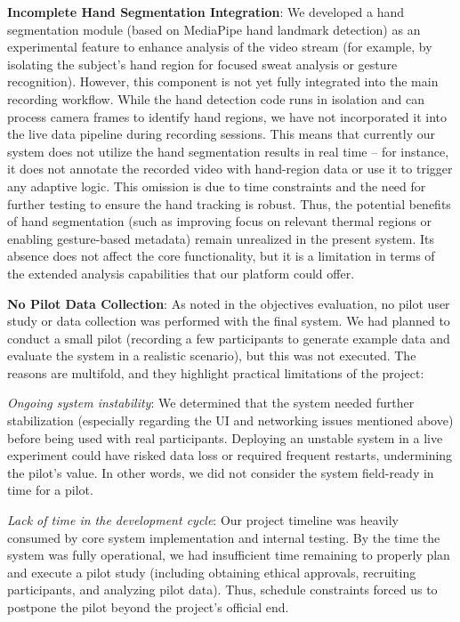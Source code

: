 \textbf{Incomplete Hand Segmentation Integration}: We developed a hand segmentation module (based on MediaPipe hand landmark detection) as an experimental feature to enhance analysis of the video stream (for example, by isolating the subject's hand region for focused sweat analysis or gesture recognition). However, this component is not yet fully integrated into the main recording workflow. While the hand detection code runs in isolation and can process camera frames to identify hand regions, we have not incorporated it into the live data pipeline during recording sessions. This means that currently our system does not utilize the hand segmentation results in real time -- for instance, it does not annotate the recorded video with hand-region data or use it to trigger any adaptive logic. This omission is due to time constraints and the need for further testing to ensure the hand tracking is robust. Thus, the potential benefits of hand segmentation (such as improving focus on relevant thermal regions or enabling gesture-based metadata) remain unrealized in the present system. Its absence does not affect the core functionality, but it is a limitation in terms of the extended analysis capabilities that our platform could offer.

\textbf{No Pilot Data Collection}: As noted in the objectives evaluation, no pilot user study or data collection was performed with the final system. We had planned to conduct a small pilot (recording a few participants to generate example data and evaluate the system in a realistic scenario), but this was not executed. The reasons are multifold, and they highlight practical limitations of the project:

\textit{Ongoing system instability}: We determined that the system needed further stabilization (especially regarding the UI and networking issues mentioned above) before being used with real participants. Deploying an unstable system in a live experiment could have risked data loss or required frequent restarts, undermining the pilot's value. In other words, we did not consider the system field-ready in time for a pilot.

\textit{Lack of time in the development cycle}: Our project timeline was heavily consumed by core system implementation and internal testing. By the time the system was fully operational, we had insufficient time remaining to properly plan and execute a pilot study (including obtaining ethical approvals, recruiting participants, and analyzing pilot data). Thus, schedule constraints forced us to postpone the pilot beyond the project's official end.

